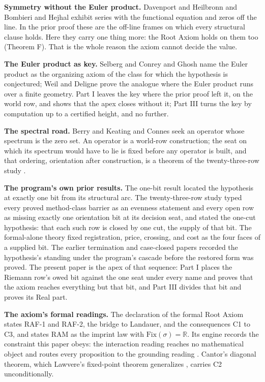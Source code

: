 \documentclass[10pt,twocolumn]{article}
\begin{document}
\textbf{Symmetry without the Euler product.} Davenport and Heilbronn
\cite{davenport1936} and Bombieri and Hejhal \cite{bombieri1995} exhibit
series with the functional equation and zeros off the line. In the prior
proof these are the off-line frames on which every structural clause
holds. Here they carry one thing more: the Root Axiom holds on them too
(Theorem F). That is the whole reason the axiom cannot decide the value.

\textbf{The Euler product as key.} Selberg \cite{selberg1992} and Conrey
and Ghosh \cite{conrey1993} name the Euler product as the organizing
axiom of the class for which the hypothesis is conjectured; Weil
\cite{weil1948} and Deligne \cite{deligne1974} prove the analogue where
the Euler product runs over a finite geometry. Part I leaves the key
where the prior proof left it, on the world row, and shows that the apex
closes without it; Part III turns the key by computation up to a
certified height, and no further.

\textbf{The spectral road.} Berry and Keating \cite{berry1999} and
Connes \cite{connes1999} seek an operator whose spectrum is the zero
set. An operator is a world-row construction; the seat on which its
spectrum would have to lie is fixed before any operator is built, and
that ordering, orientation after construction, is a theorem of the
twenty-three-row study \cite{islamrows}.

\textbf{The program's own prior results.} The one-bit result
\cite{islamonebit} located the hypothesis at exactly one bit from its
structural arc. The twenty-three-row study \cite{islamrows} typed every
proved method-class barrier as an evenness statement and every open row
as missing exactly one orientation bit at its decision seat, and stated
the one-cut hypothesis: that each such row is closed by one cut, the
supply of that bit. The formal-alone theory \cite{islamftoe} fixed
registration, price, crossing, and cost as the four faces of a supplied
bit. The earlier termination and case-closed papers
\cite{islamterm, islamclosed} recorded the hypothesis's standing under
the program's cascade before the restored form was proved. The present
paper is the apex of that sequence: Part I places the Riemann row's owed
bit against the one seat under every name and proves that the axiom
reaches everything but that bit, and Part III divides that bit and
proves its Real part.

\textbf{The axiom's formal readings.} The declaration of the formal Root
Axiom \cite{islamraf} states RAF-1 and RAF-2, the bridge to Landauer,
and the consequences C1 to C3, and states RAM as the imprint law with
\(\mathrm{Fix}(\sigma) = \mathbb{R}\). Its engine records the constraint
this paper obeys: the interaction reading reaches no mathematical object
and routes every proposition to the grounding reading \cite{islamfae}.
Cantor's diagonal theorem, which Lawvere's fixed-point theorem
generalizes \cite{lawvere1969}, carries C2 unconditionally.
\end{document}
